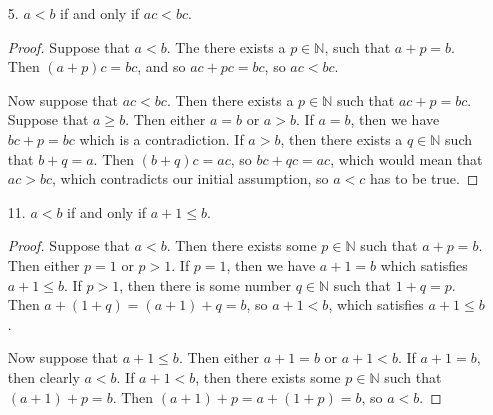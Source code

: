 \documentclass{article}
\newcommand{\N}{\mathbb{N}}
\begin{document}
\begin{enumerate}
\begin{proof}
		Now suppose that $a + c < b + c$. Then there exists some $p \in \N$ such that $a + c + p = b + c$. Since $a +p + c = b + c$, we know that $a + p = b$, so $a < b$.
	\end{proof}
	\item[5. ] $a < b$ if and only if $ac < bc$.
	\begin{proof}
		Suppose that $a < b$. The there exists a $p \in \N$, such that $a + p = b$. Then $(a + p)c = bc$, and so $ac + pc = bc$, so $ac < bc$.
		
		Now suppose that $ac < bc$. Then there exists a $p \in \N$ such that $ac + p = bc$. Suppose that $a \ge b$. Then either $a = b$ or $a > b$. If $a = b$, then we have $bc + p = bc$ which is a contradiction. If $a > b$, then there exists a $q \in \N$ such that $b + q = a$. Then $(b + q)c = ac$, so $bc + qc = ac$, which would mean that $ac > bc$, which contradicts our initial assumption, so $a < c$ has to be true.
	\end{proof}
	\item[11. ] $a < b$ if and only if $a + 1 \le b$.
	\begin{proof}
		Suppose that $a < b$. Then there exists some $p \in \N$ such that $a + p = b$. Then either $p = 1$ or $p > 1$. If $p = 1$, then we have $a + 1 = b$ which satisfies $a + 1 \le b$. If $p > 1$, then there is some number $q \in \N$ such that $1 + q = p$. Then $a + (1 + q) = (a + 1) + q = b$, so $a + 1 < b$, which satisfies $a + 1 \le b$.

		Now suppose that $a + 1 \le b$. Then either $a + 1 = b$ or $a + 1 < b$. If $a + 1 = b$, then clearly $a < b$. If $a + 1 < b$, then there exists some $p \in \N$ such that $(a + 1) + p = b$. Then $(a + 1) + p = a + (1 + p) = b$, so $a < b$.
	\end{proof}
\end{enumerate}
\end{document}
